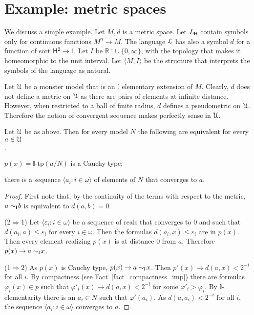 \documentclass[10pt,oneside]{amsproc}
\newcommand{\mylabel}[1]{{#1}\hfill}
\renewenvironment{itemize}
  {\begin{list}{$\cdot$}{%
  \setlength{\parskip}{0mm}
  \setlength{\topsep}{.4\baselineskip}
  \setlength{\rightmargin}{0mm}
  \setlength{\listparindent}{0mm}
  \setlength{\itemindent}{0mm}
  \setlength{\labelwidth}{3ex}
  \setlength{\itemsep}{.2\baselineskip}
  \setlength{\parsep}{.2\baselineskip}
  \setlength{\partopsep}{0mm}
  \setlength{\labelsep}{1ex}
  \setlength{\leftmargin}{\labelwidth+\labelsep}
  \let\makelabel\mylabel}}{%
\end{list}}
\begin{document}
\section{Example: metric spaces}

We discuss a simple example.
Let $M,d$ is a metric space.
Let $L_{\sf H}$ contain symbols only for continuous functions $M^n\to M$.
The language ${\EuScript L}$ has also a symbol $d$ for a function of sort ${\sf H}^2\to {\sf I}$.
Let $I$ be $\mathds{R}^+\cup\{0,\infty\}$, with the topology that makes it homeomorphic to the unit interval.
Let $\langle M,I\rangle$ be the structure that interprets the symbols of the language as natural.

Let ${\EuScript U}$ be a monster model that is  an $\mathds{I}$ elementary extension of $M$.
Clearly, $d$ does not define a metric on ${\EuScript U}$ as there are pairs of elements at infinite distance.
However, when restricted to a ball of finite radius, $d$ defines a pseudometric on  ${\EuScript U}$.
Therefore the notion of convergent sequence makes perfectly sense in ${\EuScript U}$.

\begin{fact}
  Let $ {\EuScript U}$ be as above.
  Then for every model $N$ the following are equivalent for every $a\in{\EuScript U}$
  \begin{itemize}
    \item[1.] $p(x)=\mathds{I}\mbox{-tp}(a/N)$ is a Cauchy type;
    \item[2.] there is a sequence $\langle a_i: i\in\omega\rangle$ of elements of $N$ that converges to $a$.
  \end{itemize} 
\end{fact}

\begin{proof}
  First note that, by the continuity of the terms with respect to the metric, $a\sim_{\sf I}\!b$ is equivalent to $d(a,b)=0$.

  (2$\Rightarrow$1) 
  Let $\langle \varepsilon_i: i\in\omega\rangle$ be a sequence of reals that converges to $0$ and such that $d(a_i,a)\le\varepsilon_i$ for every $i\in\omega$.
  Then the formulas $d(a_i,x)\le\varepsilon_i$ are in $p(x)$.
  Then every element realizing $p(x)$ is at distance $0$ from $a$.
  Therefore  $p(x)\rightarrow a\sim_{\sf I}\!x$.


  (1$\Rightarrow$2) 
  As $p(x)$ is Cauchy type, $p(x)\rightarrow a\sim_{\sf I}\!x$.
  Then $p'(x)\rightarrow d(a,x)<2^{-i}$ for all $i$.
  By compactness (see Fact~\ref{fact_compactness_imp}) there are formulas $\varphi_i(x)\in p$ such that $\varphi'_i(x)\rightarrow d(a,x)<2^{-i}$ for some $\varphi'_i>\varphi_i$.
  By $\mathds{I}$-elementarity there is an $a_i\in N$ such that $\varphi'(a_i)$.
  As $d(a,a_i)<2^{-i}$ for all $i$, the sequence $\langle a_i: i\in\omega\rangle$ converges to $a$.
\end{proof}
\end{document}
